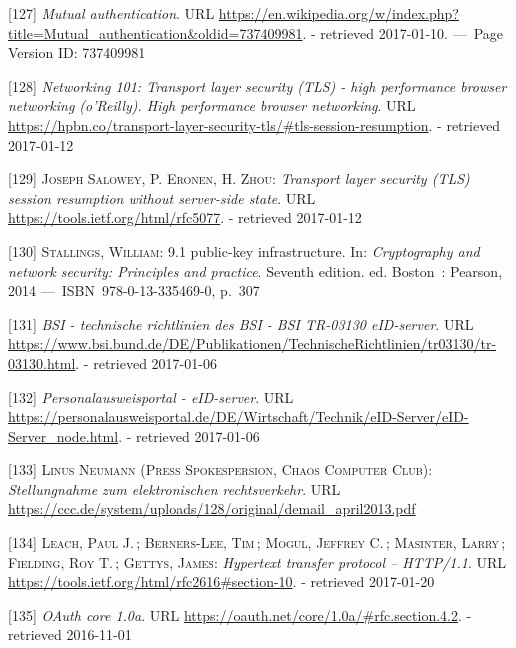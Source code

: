 \documentclass[12pt,english,a4paper,titlepage,cleardoublepage=empty,dottedtoc]{report}
\begin{document}
\hypertarget{ref-web_2017_wikipedia_mutual-auth}{}
{[}127{]} \emph{Mutual authentication}. URL
\url{https://en.wikipedia.org/w/index.php?title=Mutual_authentication\&oldid=737409981}.
- retrieved 2017-01-10. ---~Page Version ID: 737409981

\hypertarget{ref-book_2013_networking-101_tls-session-resumption}{}
{[}128{]} \emph{Networking 101: Transport layer security (TLS) - high
performance browser networking (o'Reilly). High performance browser
networking}. URL
\url{https://hpbn.co/transport-layer-security-tls/\#tls-session-resumption}.
- retrieved 2017-01-12

\hypertarget{ref-web_spec_tls-session-ticket-resumption}{}
{[}129{]} \textsc{Joseph Salowey, P. Eronen, \textnormal{H. Zhou}}:
\emph{Transport layer security (TLS) session resumption without
server-side state}. URL \url{https://tools.ietf.org/html/rfc5077}. -
retrieved 2017-01-12

\hypertarget{ref-book_2014_chapter-10-5-asym-random-number-gen}{}
{[}130{]} \textsc{Stallings, William}: 9.1 public-key infrastructure.
In: \emph{Cryptography and network security: Principles and practice}.
Seventh edition. ed. Boston~: Pearson, 2014 ---~ISBN~978-0-13-335469-0,
p.~307

\hypertarget{ref-web_bsi-spec_eid}{}
{[}131{]} \emph{BSI - technische richtlinien des BSI - BSI TR-03130
eID-server}. URL
\url{https://www.bsi.bund.de/DE/Publikationen/TechnischeRichtlinien/tr03130/tr-03130.html}.
- retrieved 2017-01-06

\hypertarget{ref-web_2017_npa-eid-server}{}
{[}132{]} \emph{Personalausweisportal - eID-server}. URL
\url{https://personalausweisportal.de/DE/Wirtschaft/Technik/eID-Server/eID-Server_node.html}.
- retrieved 2017-01-06

\hypertarget{ref-statement_2013_de-mail}{}
{[}133{]} \textsc{Linus Neumann (Press Spokespersion, Chaos Computer
Club)}: \emph{Stellungnahme zum elektronischen rechtsverkehr}. URL
\url{https://ccc.de/system/uploads/128/original/demail_april2013.pdf}

\hypertarget{ref-web_spec_http-error-codes}{}
{[}134{]} \textsc{Leach, Paul J.}\,; \textsc{Berners-Lee, Tim}\,;
\textsc{Mogul, Jeffrey C.}\,; \textsc{Masinter, Larry}\,;
\textsc{Fielding, Roy T.}\,; \textsc{Gettys, James}: \emph{Hypertext
transfer protocol -- HTTP/1.1}. URL
\url{https://tools.ietf.org/html/rfc2616\#section-10}. - retrieved
2017-01-20

\hypertarget{ref-web_spec_oauth-1a_client-reg}{}
{[}135{]} \emph{OAuth core 1.0a}. URL
\url{https://oauth.net/core/1.0a/\#rfc.section.4.2}. - retrieved
2016-11-01
\end{document}

